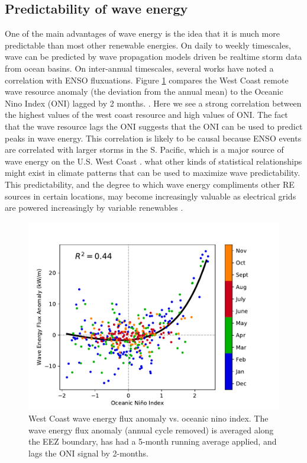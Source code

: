 \subsection{Predictability of wave energy}
One of the main advantages of wave energy is the idea that it is much more predictable than most other renewable energies. On daily to weekly timescales, wave can be predicted by wave propagation models driven be realtime storm data from ocean basins. On inter-annual timescales, several works have noted a correlation with ENSO fluxuations. Figure \ref{fig:wc-nino} compares the West Coast remote wave resource anomaly (the deviation from the annual mean) to the Oceanic Nino Index (ONI) lagged by 2 months. \cite{nationaloceanicandatmosphericadministrationOceanicNinoIndex2020}.
Here we see a strong correlation between the highest values of the west coast resource and high values of ONI. The fact that the wave resource lags the ONI suggests that the ONI can be used to predict peaks in wave energy. This correlation is likely to be causal because ENSO events are correlated with larger storms in the S. Pacific, which is a major source of wave energy on the U.S. West Coast \cite{andersonClimateIndexOptimized2018, yangCharacteristicsVariabilityNearshore2020}. 
what other kinds of statistical relationships might exist in climate patterns that can be used to maximize wave predictability. This predictability, and the degree to which wave energy compliments other RE sources in certain locations, may become increasingly valuable as electrical grids are powered increasingly by variable renewables \cite{parkinsonIntegratingOceanWave2015}.

\begin{figure}[ht]
  \centering
  \includegraphics[width=\textwidth]{../fig/ENSO-Comparison.wc.pdf}
  \caption{West Coast wave energy flux anomaly vs. oceanic nino index. The wave energy flux anomaly (annual cycle removed) is averaged along the EEZ boundary, has had a 5-month running average applied, and lags the ONI signal by 2-months.}
  \label{fig:wc-nino}
\end{figure}


